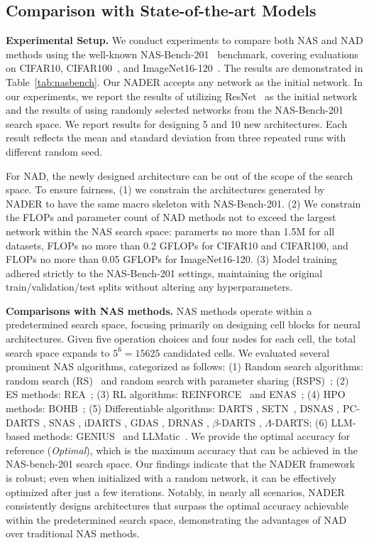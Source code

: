 \subsection{Comparison with State-of-the-art Models}
\textbf{Experimental Setup.}
We conduct experiments to compare both NAS and NAD methods using the well-known NAS-Bench-201~\cite{dong2020bench} benchmark, covering evaluations on CIFAR10, CIFAR100~\cite{krizhevsky2009learning}, and ImageNet16-120~\cite{chrabaszcz2017downsampled}. The results are demonstrated in Table~\ref{tab:nasbench}. 
Our NADER accepts any network as the initial network. In our experiments, we report the results of utilizing ResNet~\cite{he2016deep} as the initial network and the results of using randomly selected networks from the NAS-Bench-201 search space. We report results for designing 5 and 10 new architectures. Each result reflects the mean and standard deviation from three repeated runs with different random seed.

For NAD, the newly designed architecture can be out of the scope of the search space.
To ensure fairness, (1) we constrain the architectures generated by NADER to have the same macro skeleton with NAS-Bench-201. (2) We constrain the FLOPs and parameter count of NAD methods not to exceed the largest network within the NAS search space: paramerts no more than 1.5M for all datasets, FLOPs no more than 0.2 GFLOPs for CIFAR10 and CIFAR100, and FLOPs no more than 0.05 GFLOPs for ImageNet16-120. (3) Model training adhered strictly to the NAS-Bench-201 settings, maintaining the original train/validation/test splits without altering any hyperparameters.

\textbf{Comparisons with NAS methods.}
NAS methods operate within a predetermined search space, focusing primarily on designing cell blocks for neural architectures. Given five operation choices and four nodes for each cell, the total search space expands to $5^6 = 15625$ candidated cells. We evaluated several prominent NAS algorithms, categorized as follows:
(1) Random search algorithms: random search (RS)~\cite{bergstra2012random} and random search with parameter sharing (RSPS)~\cite{li2020random};
(2) ES methods: REA~\cite{real2019regularized};
(3) RL algorithms: REINFORCE~\cite{williams1992simple} and ENAS~\cite{pham2018efficient};
(4) HPO methods: BOHB~\cite{falkner2018bohb}; 
(5) Differentiable algorithms: DARTS \cite{liu2018darts}, SETN~\cite{dong2019one}, DSNAS \cite{hu2020dsnas}, PC-DARTS \cite{xu2019pc}, SNAS \cite{xie2018snas}, iDARTS \cite{zhang2021idarts}, GDAS \cite{dong2019searching}, DRNAS \cite{chen2020drnas}, $\beta$-DARTS \cite{ye2022b}, $\Lambda$-DARTS;
(6) LLM-based methods: GENIUS~\cite{zheng2023can} and LLMatic~\cite{nasir2023llmatic}. We provide the optimal accuracy for reference (\textit{Optimal}), which is the maximum accuracy that can be achieved in the NAS-bench-201 search space. 
Our findings indicate that the NADER framework is robust; even when initialized with a random network, it can be effectively optimized after just a few iterations. Notably, in nearly all scenarios, NADER consistently designs architectures that surpass the optimal accuracy achievable within the predetermined search space, demonstrating the advantages of NAD over traditional NAS methods.

